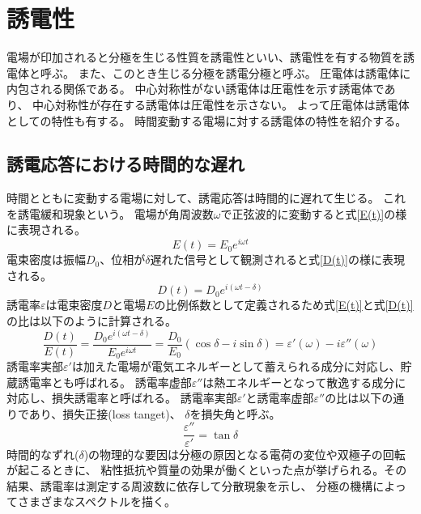 \documentclass[dvipdfmx,12pt,a4paper]{jreport}
\begin{document}
			\newpage
		\section{誘電性}
		電場が印加されると分極を生じる性質を誘電性といい、誘電性を有する物質を誘電体と呼ぶ。
		また、このとき生じる分極を誘電分極と呼ぶ。
		圧電体は誘電体に内包される関係である。
		中心対称性がない誘電体は圧電性を示す誘電体であり、
		中心対称性が存在する誘電体は圧電性を示さない。
		よって圧電体は誘電体としての特性も有する。
		時間変動する電場に対する誘電体の特性を紹介する。
			\subsection{誘電応答における時間的な遅れ}
			時間とともに変動する電場に対して、誘電応答は時間的に遅れて生じる。
			これを誘電緩和現象という。
			電場が角周波数$\omega$で正弦波的に変動すると式\eqref{E(t)}の様に表現される。
			\begin{equation}
				E(t)=E_0 e^{i\omega t}
				\label{E(t)}
			\end{equation}
			電束密度は振幅$D_0$、位相が$\delta$遅れた信号として観測されると式\eqref{D(t)}の様に表現される。
			\begin{equation}
				D(t)=D_0 e^{i(\omega t-\delta)}
				\label{D(t)}
			\end{equation}
			誘電率$\varepsilon$は電束密度$D$と電場$E$の比例係数として定義されるため式\eqref{E(t)}と式\eqref{D(t)}
			の比は以下のように計算される。
			\begin{equation}
				\frac{D(t)}{E(t)}=\frac{D_0e^{i(\omega t-\delta)}}{E_0 e^{i\omega t}}
				=\frac{D_0}{E_0}\left(\cos\delta-i\sin\delta\right)=\varepsilon'(\omega)-i\varepsilon''(\omega)
			\end{equation}
			誘電率実部$\varepsilon'$は加えた電場が電気エネルギーとして蓄えられる成分に対応し、貯蔵誘電率とも呼ばれる。
			誘電率虚部$\varepsilon''$は熱エネルギーとなって散逸する成分に対応し、損失誘電率と呼ばれる。
			誘電率実部$\varepsilon'$と誘電率虚部$\varepsilon''$の比は以下の通りであり、損失正接(loss tanget)、
			$\delta$を損失角と呼ぶ。
			\begin{equation}
				\frac{\varepsilon''}{\varepsilon'}=\tan\delta
				\label{tandel}
			\end{equation}
			時間的なずれ($\delta$)の物理的な要因は分極の原因となる電荷の変位や双極子の回転が起こるときに、
			粘性抵抗や質量の効果が働くといった点が挙げられる。その結果、誘電率は測定する周波数に依存して分散現象を示し、
			分極の機構によってさまざまなスペクトルを描く。
\end{document}
